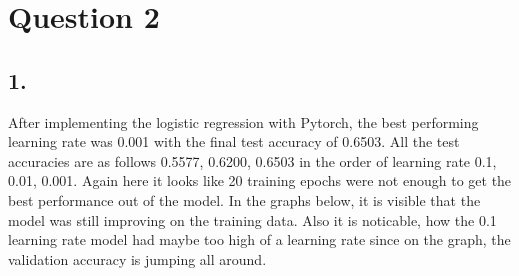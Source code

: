 \documentclass[11pt]{article}
\begin{document}
\section{Question 2}
\subsection{1.}
After implementing the logistic regression with Pytorch, the best performing learning rate was 0.001 with the final test accuracy of 0.6503.
All the test accuracies are as follows 0.5577, 0.6200, 0.6503 in the order of learning rate 0.1, 0.01, 0.001.
Again here it looks like 20 training epochs were not enough to get the best performance out of the model.
In the graphs below, it is visible that the model was still improving on the training data.
Also it is noticable, how the 0.1 learning rate model had maybe too high of a learning rate since on the graph, the validation accuracy is jumping all around.
\end{document}
